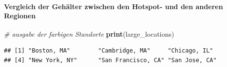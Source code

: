 \documentclass[
]{article}
\newenvironment{Shaded}{\begin{snugshade}}{\end{snugshade}}
\newcommand{\CommentTok}[1]{\textcolor[rgb]{0.56,0.35,0.01}{\textit{#1}}}
\newcommand{\FunctionTok}[1]{\textcolor[rgb]{0.13,0.29,0.53}{\textbf{#1}}}
\newcommand{\NormalTok}[1]{#1}
\begin{document}
\paragraph{Vergleich der Gehälter zwischen den Hotspot- und den anderen
Regionen}\label{vergleich-der-gehuxe4lter-zwischen-den-hotspot--und-den-anderen-regionen}

\begin{Shaded}
\begin{Highlighting}[]
\CommentTok{\# ausgabe der farbigen Standorte}
\FunctionTok{print}\NormalTok{(large\_locations)}
\end{Highlighting}
\end{Shaded}

\begin{verbatim}
## [1] "Boston, MA"        "Cambridge, MA"     "Chicago, IL"      
## [4] "New York, NY"      "San Francisco, CA" "San Jose, CA"
\end{verbatim}
\end{document}
